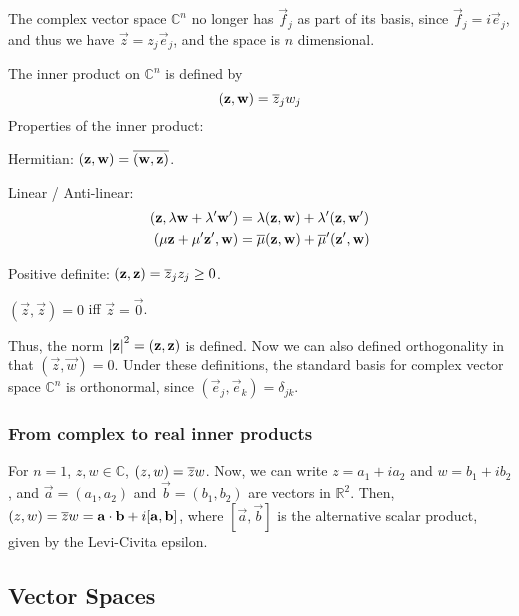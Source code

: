 \documentclass[12pt]{article}
\begin{document}
The complex vector space $\mathbb{C}^{n}$
no longer has $\vec{f}_j$ as part of its basis,
since $\vec{f}_j = i \vec{e}_j$,
and thus we have $\vec{z} = z_j \vec{e}_j$,
and the space is $n$ dimensional.

The inner product on $\mathbb{C}^{n}$ is defined by
\[
    (\mathbf{z},\mathbf{w}) = \overline{z}_j w_j
\]
Properties of the inner product:
\begin{compactenum}[(i)]
\item Hermitian: $(\mathbf{z},\mathbf{w}) = \overline{(\mathbf{w},\mathbf{z})}$.
\item Linear / Anti-linear:
    \begin{align*}
        (\mathbf{z},\lambda\mathbf{w} + \lambda'\mathbf{w'}) 
        &= \lambda(\mathbf{z},\mathbf{w}) + \lambda'(\mathbf{z},\mathbf{w'})\\
        (\mu\mathbf{z}+\mu'\mathbf{z'},\mathbf{w}) 
        &= \overline{\mu}(\mathbf{z},\mathbf{w}) + \overline{\mu}'(\mathbf{z'},\mathbf{w})
    \end{align*}
\item Positive definite: $(\mathbf{z},\mathbf{z}) = \overline{z}_j z_j \ge 0$.
\item $(\vec{z},\vec{z}) = 0$ iff $\vec{z} = \vec{0}$.
\end{compactenum}
Thus, the norm $\left\lvert \mathbf{z} \right\rvert^{2} = (\mathbf{z},\mathbf{z})$ is defined.
Now we can also defined orthogonality in that $(\vec{z},\vec{w})=0$.
Under these definitions, the standard basis for complex
vector space $\mathbb{C}^{n}$ is orthonormal, since $(\vec{e}_j, \vec{e}_k) = \delta_{jk}$.

\subsubsection{From complex to real inner products}

For $n=1$, $z,w \in \mathbb{C}$, $(z,w) = \overline{z} w$.
Now, we can write $z=a_{1}+ia_{2}$ and $w=b_{1}+ib_{2}$,
and $\vec{a}=(a_{1},a_{2})$ and $\vec{b}=(b_{1},b_{2})$ are vectors in $\mathbb{R}^{2}$.
Then, $(z,w) = \overline{z} w = \mathbf{a} \cdot \mathbf{b} + i[\mathbf{a},\mathbf{b}]$,
where $[\vec{a},\vec{b}]$ is the alternative scalar product,
given by the Levi-Civita epsilon.

\subsection{Vector Spaces}
\end{document}
